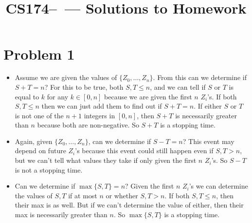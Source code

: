 \documentclass[11pt]{article}
\title{CS174--\Session\  --- Solutions to Homework \Homework}
\author{\Name}
\begin{document}
\maketitle
{}
\setcounter{problemnumber}{0}

\section*{Problem 1}
\begin{itemize}
\item Assume we are given the values of $\{Z_0,\ldots,Z_n\}$. From this can we determine if $S+T=n$? For this to be true, both $S,T \leq n$, and we can tell if $S$ or $T$ is equal to $k$ for any $k\in [0,n]$ because we are given the first $n$ $Z_i$'s. If both $S,T\leq n$ then we can just add them to find out if $S+T=n$. If either $S$ or $T$ is not one of the $n+1$ integers in $[0,n]$, then $S+T$ is necessarily greater than $n$ because both are non-negative. So $S+T$ is a stopping time.
\item Again, given $\{Z_0,\ldots,Z_n\}$, can we determine if $S-T=n$? This event may depend on future $Z_i$'s because this event could still happen even if $S,T>n$, but we can't tell what values they take if only given the first $n$ $Z_i$'s. So $S-T$ is not a stopping time.
\item Can we determine if $\max\{S,T\}=n$? Given the first $n$ $Z_i$'s we can determine the values of $S,T$ if at most $n$ or whether $S,T>n$. If both $S,T\leq n$, then their max is as well. But if we can't determine the value of either, then their max is necessarily greater than $n$. So $\max\{S,T\}$ is a stopping time.
\end{itemize}


\newpage
\end{document}
